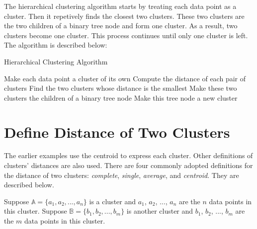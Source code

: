 The hierarchical clustering algorithm starts by treating each data
point as a cluster. Then it repetively finds the closest two clusters.
These two clusters are the two children of a binary tree node and form
one cluster.  As a result, two clusters become one cluster.  This
process continues until only one cluster is left.
The algorithm is described below:

\begin{algorithm}
    \caption[]{Hierarchical Clustering Algorithm}
    \begin{algorithmic}[1]
      \ForAll  Make each data point a cluster of its own
      \EndFor
      \State Compute the distance of each pair of clusters
      \State Find the two clusters whose distance is the smallest
      \State Make these two clusters the children of a binary tree node
      \State Make this tree node a new cluster 
      \EndWhile
    \end{algorithmic}
    \label{algorithm:hierarchicalclustering}
\end{algorithm}

\section{Define Distance of Two Clusters}


The earlier examples use the centroid to express each cluster.  Other
definitions of clusters' distances are also used.  There are four
commonly adopted definitions for the distance of two clusters: {\it
  complete}, {\it single}, {\it average}, and {\it centroid}.  They
are described below.

Suppose $\mathds{A} = \{a_1, a_2, ..., a_n\}$ is a cluster
and $a_1$, $a_2$, ..., $a_n$ are the $n$ data points in this cluster.
Suppose $\mathds{B} = \{b_1, b_2, ..., b_m\}$ is another cluster
and $b_1$, $b_2$, ..., $b_m$ are the $m$ data points in this cluster.


